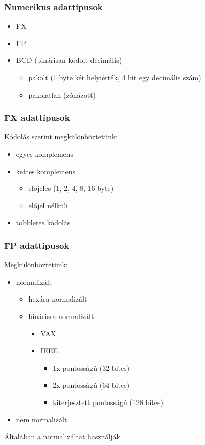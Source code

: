 \subsubsection{Numerikus adattípusok}
\begin{itemize}
    \item FX
    \item FP
    \item BCD (binárisan kódolt decimális)
    \begin{itemize}
        \item pakolt (1 byte két helyiérték, 4 bit egy decimális szám)
        \item pakolatlan (zónázott)
    \end{itemize}
\end{itemize}

\subsubsection{FX adattípusok}
Kódolás szerint megkülönböztetünk:
\begin{itemize}
    \item egyes komplemens
    \item kettes komplemens
    \begin{itemize}
        \item előjeles (1, 2, 4, 8, 16 byte)
        \item előjel nélküli
    \end{itemize}
    \item többletes kódolás
\end{itemize}

\subsubsection{FP adattípusok}
Megkülönböztetünk:
\begin{itemize}
    \item normalizált
    \begin{itemize}
        \item hexára normalizált
        \item binárisra normalizált
        \begin{itemize}
            \item VAX
            \item IEEE
            \begin{itemize}
                \item 1x pontosságú (32 bites)
                \item 2x pontosságú (64 bites)
                \item kiterjesztett pontosságú (128 bites)
            \end{itemize}
        \end{itemize}
    \end{itemize}
    \item nem normalizált
\end{itemize}
Általában a normalizáltat használják.

